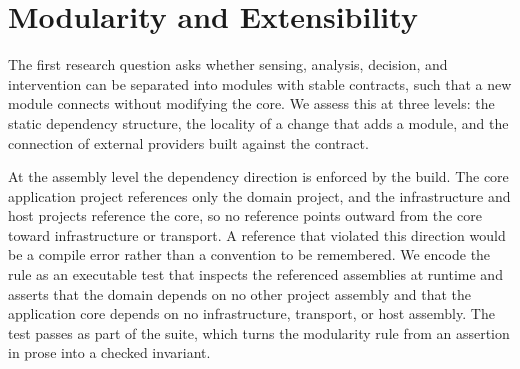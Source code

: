 \section{Modularity and Extensibility}
\label{sec:eval-modularity}

The first research question asks whether sensing, analysis, decision, and intervention can be separated into modules with stable contracts, such that a new module connects without modifying the core.
We assess this at three levels: the static dependency structure, the locality of a change that adds a module, and the connection of external providers built against the contract.

At the assembly level the dependency direction is enforced by the build.
The core application project references only the domain project, and the infrastructure and host projects reference the core, so no reference points outward from the core toward infrastructure or transport.
A reference that violated this direction would be a compile error rather than a convention to be remembered.
We encode the rule as an executable test that inspects the referenced assemblies at runtime and asserts that the domain depends on no other project assembly and that the application core depends on no infrastructure, transport, or host assembly.
The test passes as part of the suite, which turns the modularity rule from an assertion in prose into a checked invariant.

